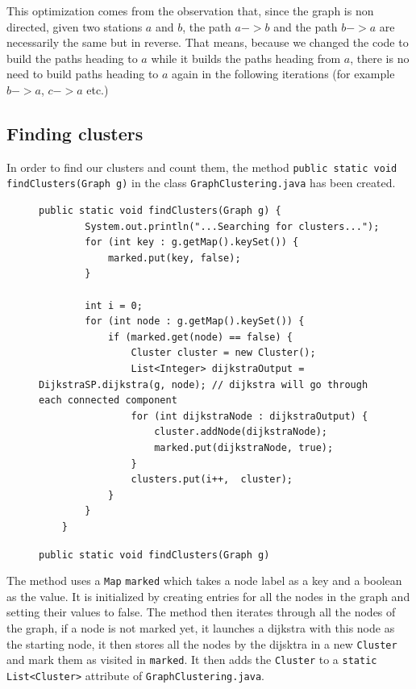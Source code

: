 \documentclass{article}
\begin{document}
\medbreak

This optimization comes from the observation that, since the graph is non directed, given two stations $a$ and $b$, the path $a->b$ and the path $b->a$ are necessarily the same but in reverse. That means, because we changed the code to build the paths heading to $a$ while it builds the paths heading from $a$, there is no need to build paths heading to $a$ again in the following iterations (for example $b->a$, $c->a$ etc.)

\newpage

\subsection{Finding clusters}

In order to find our clusters and count them, the method \texttt{public static void findClusters(Graph g)} in the class \texttt{GraphClustering.java} has been created. 

\begin{figure}[h]
\begin{verbatim}
public static void findClusters(Graph g) {
		System.out.println("...Searching for clusters...");
		for (int key : g.getMap().keySet()) {
			marked.put(key, false);
		}
		
		int i = 0;
		for (int node : g.getMap().keySet()) {
			if (marked.get(node) == false) {
				Cluster cluster = new Cluster();
				List<Integer> dijkstraOutput = DijkstraSP.dijkstra(g, node); // dijkstra will go through each connected component
				for (int dijkstraNode : dijkstraOutput) {
					cluster.addNode(dijkstraNode);
					marked.put(dijkstraNode, true);
				}
				clusters.put(i++,  cluster);
			}
		}
	}
\end{verbatim}
\caption{\texttt{public static void findClusters(Graph g)}}
\end{figure}
The method uses a \texttt{Map} \texttt{marked} which takes a node label as a key and a boolean as the value. It is initialized by creating entries for all the nodes in the graph and setting their values to false. The method then iterates through all the nodes of the graph, if a node is not marked yet, it launches a dijkstra with this node as the starting node, it then stores all the nodes by the dijsktra in a new \texttt{Cluster} and mark them as visited in \texttt{marked}. It then adds the \texttt{Cluster} to a \texttt{static List<Cluster>} attribute of \texttt{GraphClustering.java}.
\end{document}
